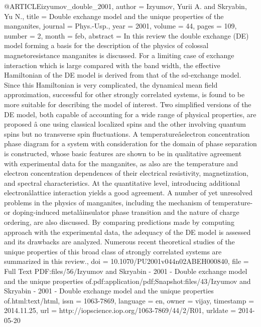 @ARTICLE{izyumov_double_2001,
  author = {Izyumov, Yurii A. and Skryabin, Yu N.},
  title = {Double exchange model and the unique properties of the manganites},
  journal = {Phys.-Usp.},
  year = {2001},
  volume = {44},
  pages = {109},
  number = {2},
  month = feb,
  abstract = {In this review the double exchange ({DE)} model forming a basis for
	the description of the physics of colossal magnetoresistance manganites
	is discussed. For a limiting case of exchange interaction which is
	large compared with the band width, the effective Hamiltonian of
	the {DE} model is derived from that of the sd-exchange model. Since
	this Hamiltonian is very complicated, the dynamical mean field approximation,
	successful for other strongly correlated systems, is found to be
	more suitable for describing the model of interest. Two simplified
	versions of the {DE} model, both capable of accounting for a wide
	range of physical properties, are proposed â one using classical
	localized spins and the other involving quantum spins but no transverse
	spin fluctuations. A temperatureâelectron concentration phase diagram
	for a system with consideration for the domain of phase separation
	is constructed, whose basic features are shown to be in qualitative
	agreement with experimental data for the manganites, as also are
	the temperature and electron concentration dependences of their electrical
	resistivity, magnetization, and spectral characteristics. At the
	quantitative level, introducing additional electronâlattice interaction
	yields a good agreement. A number of yet unresolved problems in the
	physics of manganites, including the mechanism of temperature- or
	doping-induced metalâinsulator phase transition and the nature
	of charge ordering, are also discussed. By comparing predictions
	made by computing approach with the experimental data, the adequacy
	of the {DE} model is assessed and its drawbacks are analyzed. Numerous
	recent theoretical studies of the unique properties of this broad
	class of strongly correlated systems are summarized in this review.},
  doi = {10.1070/PU2001v044n02ABEH000840},
  file = {Full Text PDF:files/56/Izyumov and Skryabin - 2001 - Double exchange model and the unique properties of.pdf:application/pdf;Snapshot:files/43/Izyumov and Skryabin - 2001 - Double exchange model and the unique properties of.html:text/html},
  issn = {1063-7869},
  language = {en},
  owner = {vijay},
  timestamp = {2014.11.25},
  url = {http://iopscience.iop.org/1063-7869/44/2/R01},
  urldate = {2014-05-20}
}

